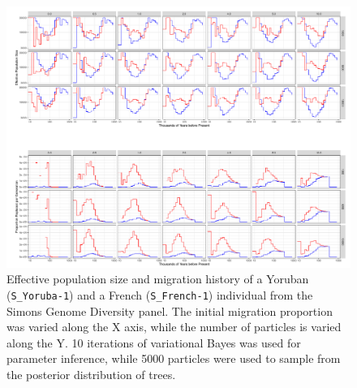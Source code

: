 \documentclass{article}
\begin{document}
\begin{figure}
	\centering
	\includegraphics[width=\textwidth]{plot/yri_dif_migs.pdf}
	\caption{Effective population size and migration history of a Yoruban ({\tt S\_Yoruba-1}) and a French ({\tt S\_French-1}) individual from the Simons Genome Diversity panel. The initial migration proportion was varied along the X axis, while the number of particles is varied along the Y. 10 iterations of variational Bayes was used for parameter inference, while 5000 particles were used to sample from the posterior distribution of trees.}
	\label{init_yri}
\end{figure}
\end{document}
